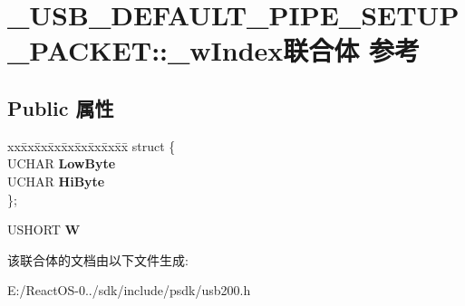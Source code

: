 \hypertarget{union___u_s_b___d_e_f_a_u_l_t___p_i_p_e___s_e_t_u_p___p_a_c_k_e_t_1_1__w_index}{}\section{\+\_\+\+U\+S\+B\+\_\+\+D\+E\+F\+A\+U\+L\+T\+\_\+\+P\+I\+P\+E\+\_\+\+S\+E\+T\+U\+P\+\_\+\+P\+A\+C\+K\+ET\+:\+:\+\_\+w\+Index联合体 参考}
\label{union___u_s_b___d_e_f_a_u_l_t___p_i_p_e___s_e_t_u_p___p_a_c_k_e_t_1_1__w_index}
\subsection*{Public 属性}
\begin{DoxyCompactItemize}
\item 
\mbox{\label{union___u_s_b___d_e_f_a_u_l_t___p_i_p_e___s_e_t_u_p___p_a_c_k_e_t_1_1__w_index_a5631dc044bc06b22fcb674529539e8d7}} 
\begin{tabbing}
xx\=xx\=xx\=xx\=xx\=xx\=xx\=xx\=xx\=\kill
struct \{\\
\>UCHAR {\bfseries LowByte}\\
\>UCHAR {\bfseries HiByte}\\
\}; \\

\end{tabbing}\item 
\mbox{\label{union___u_s_b___d_e_f_a_u_l_t___p_i_p_e___s_e_t_u_p___p_a_c_k_e_t_1_1__w_index_a49af9db9aff5530b1ce5956bafdd522e}} 
U\+S\+H\+O\+RT {\bfseries W}
\end{DoxyCompactItemize}


该联合体的文档由以下文件生成\+:\begin{DoxyCompactItemize}
\item 
E\+:/\+React\+O\+S-\/0../sdk/include/psdk/usb200.\+h\end{DoxyCompactItemize}

